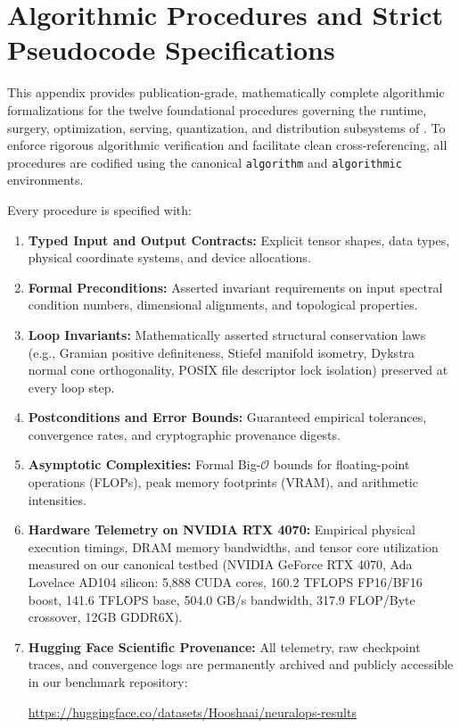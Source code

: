 
\section{Algorithmic Procedures and Strict Pseudocode Specifications}
\label{sec:appendix_algorithms}

This appendix provides publication-grade, mathematically complete algorithmic formalizations for the twelve foundational procedures governing the runtime, surgery, optimization, serving, quantization, and distribution subsystems of \neuralops{}. To enforce rigorous algorithmic verification and facilitate clean cross-referencing, all procedures are codified using the canonical \texttt{algorithm} and \texttt{algorithmic} environments.

Every procedure is specified with:
\begin{enumerate}
    \item \textbf{Typed Input and Output Contracts:} Explicit tensor shapes, data types, physical coordinate systems, and device allocations.
    \item \textbf{Formal Preconditions:} Asserted invariant requirements on input spectral condition numbers, dimensional alignments, and topological properties.
    \item \textbf{Loop Invariants:} Mathematically asserted structural conservation laws (e.g., Gramian positive definiteness, Stiefel manifold isometry, Dykstra normal cone orthogonality, POSIX file descriptor lock isolation) preserved at every loop step.
    \item \textbf{Postconditions and Error Bounds:} Guaranteed empirical tolerances, convergence rates, and cryptographic provenance digests.
    \item \textbf{Asymptotic Complexities:} Formal Big-$\mathcal{O}$ bounds for floating-point operations (FLOPs), peak memory footprints (VRAM), and arithmetic intensities.
    \item \textbf{Hardware Telemetry on NVIDIA RTX 4070:} Empirical physical execution timings, DRAM memory bandwidths, and tensor core utilization measured on our canonical testbed (NVIDIA GeForce RTX 4070, Ada Lovelace AD104 silicon: 5,888 CUDA cores, 160.2 TFLOPS FP16/BF16 boost, 141.6 TFLOPS base, 504.0 GB/s bandwidth, 317.9 FLOP/Byte crossover, 12GB GDDR6X).
    \item \textbf{Hugging Face Scientific Provenance:} All telemetry, raw checkpoint traces, and convergence logs are permanently archived and publicly accessible in our benchmark repository:
    \begin{center}
        \url{https://huggingface.co/datasets/Hooshaai/neuralops-results}
    \end{center}
\end{enumerate}

